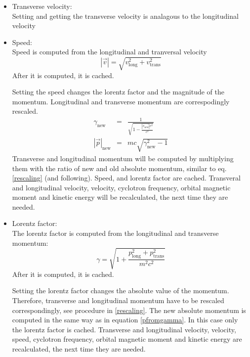 \begin{itemize}
		\item Transverse velocity:\\
		Setting and getting the transverse velocity is analagous to the longitudinal velocity
            
		\item Speed:\\
		Speed is computed from the longitudinal and tranversal velocity           
		\begin{equation}
			|\vec{v}| = \sqrt{v_{\mathrm{long}}^{2}+v_{\mathrm{trans}}^{2}}
		\end{equation}
		After it is computed, it is cached.  
		
		Setting the speed changes the lorentz factor and the magnitude of the momentum. Longitudinal and transverse momentum are correspodingly rescaled.
		\begin{eqnarray}
		\label{pfromgamma}
			\gamma_{\mathrm{new}} &=& \frac{1}{\sqrt{1-\frac{|\vec{v_{\mathrm{new}}}|e^2}{c^2}}}\\
			| \vec{p} |_{\mathrm{new}} &=& m c \sqrt{\gamma_{\mathrm{new}}^2-1}
		\end{eqnarray}
		Transverse and longitudinal momentum will be computed by multiplying them with the ratio of new and old absolute momentum, similar to eq. \ref{rescaling} (and following).
		Speed, and lorentz factor are cached. Transveral and longitudinal velocity, velocity, cyclotron frequency, orbital magnetic moment and kinetic energy will be recalculated, the next time they are needed.
	

		\item Lorentz factor:\\
		The lorentz factor is computed from the longitudinal and transverse momentum:
		\begin{equation}
			\gamma = \sqrt{1+\frac{p_{\mathrm{long}}^{2}+p_{\mathrm{trans}}^{2}}{m^2 c^2}}
		\end{equation}
		After it is computed, it is cached.  
            
		Setting the lorentz factor changes the absolute value of the momentum. Therefore, transverse and longitudinal momentum have to be rescaled correspondingly, see procedure in \ref{rescaling}. The new absolute momentum is computed in the same way as in equation \ref{pfromgamma}. In this case only the lorentz factor is cached. Transverse and longitudinal velocity, velocity, speed, cyclotron frequency, orbital magnetic moment and kinetic energy are recalculated, the next time they are needed.


\end{itemize}
